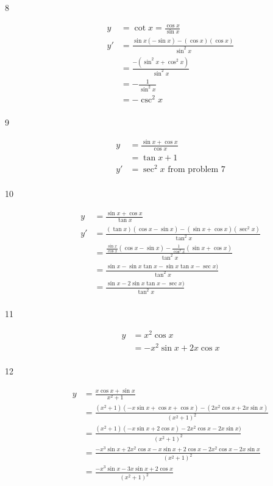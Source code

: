 \documentclass{exam}
\begin{document}
\begin{description}
\item[8]
\begin{align*}
  y  &= \cot x = \frac{\cos x}{\sin x} \\
  y' &= \frac{\sin x(- \sin x) - (\cos x) (\cos x)}{\sin^2 x} \\ 
     &= \frac{- (\sin^2 x + \cos^2 x)}{\sin^2 x} \\ 
     &= - \frac{1}{\sin^2 x} \\ 
     &= - \csc^2 x \\
\end{align*}

\item[9]
\begin{align*}
  y  &= \frac{\sin x + \cos x}{\cos x} \\
     &= \tan x + 1 \\
  y' &= \sec^2 x \text{ from problem 7} \\
\end{align*}

\item[10]
\begin{align*}
  y  &= \frac{\sin x + \cos x}{\tan x} \\
  y' &= \frac{(\tan x)(\cos x - \sin x) - (\sin x + \cos x)(\sec^2 x)}{\tan^2 x}  \\
     &= \frac{\frac{\sin x}{\cos x}(\cos x - \sin x) - \frac{1}{\cos^2 x}(\sin x + \cos x)}{\tan^2 x}  \\
     &= \frac{\sin x - \sin x \tan x - \sin x \tan x - \sec x)}{\tan^2 x}  \\
     &= \frac{\sin x - 2 \sin x \tan x - \sec x)}{\tan^2 x}  \\
\end{align*}

\item[11]
\begin{align*}
  y  &= x^2 \cos x \\
     &= - x^2 \sin x + 2x \cos x \\
\end{align*}

\item[12]
\begin{align*}
  y  &= \frac{x \cos x + \sin x}{x^2 + 1} \\
     &= \frac{(x^2 + 1)(- x \sin x + \cos x + \cos x) - (2x^2 \cos x + 2x \sin x)}{(x^2 + 1)^2} \\
     &= \frac{(x^2 + 1)(- x \sin x + 2\cos x) - 2x^2 \cos x - 2x \sin x)}{(x^2 + 1)^2} \\
     &= \frac{-x^3 \sin x + 2 x^2 \cos x - x\sin x + 2 \cos x - 2x^2 \cos x - 2x \sin x}{(x^2 + 1)^2} \\
     &= \frac{-x^3 \sin x - 3x\sin x + 2 \cos x}{(x^2 + 1)^2} \\
\end{align*}


\end{description}
\end{document}
